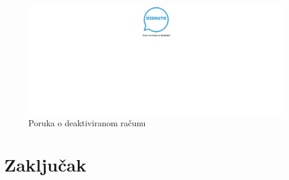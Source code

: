 \documentclass{foi}
\begin{document}
\begin{figure}[h!]
    \centering
    \includegraphics[width=1\textwidth]{slike/deaktivacija.png}
    \caption{Poruka o deaktiviranom računu}
\end{figure}

\chapter{Zaključak}

\printbibliography[title=Popis literature]

\listoffigures
{}
\end{document}
